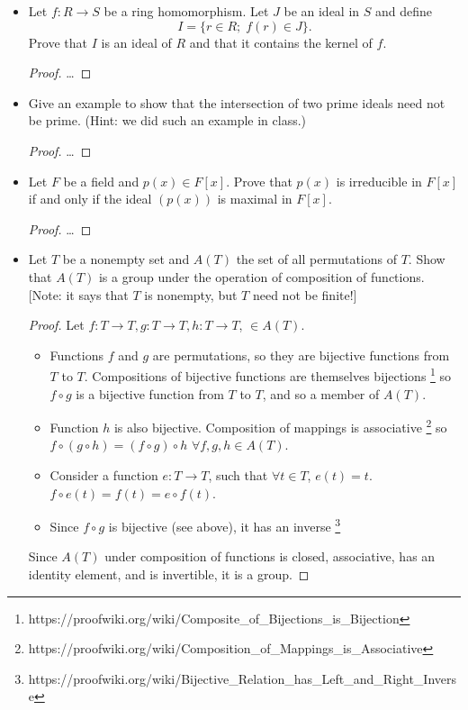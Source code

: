 \documentclass[12pt]{article}
\begin{document}
\begin{itemize}
		\item[\textbf{ 6.2.22.}] Let $f: R\to S$ be a ring homomorphism. Let $J$ be an ideal in $S$ and define \[I=\{r\in R;\; f(r)\in J\}.\] Prove that $I$ is an ideal of $R$ and that it contains the kernel of $f$.
		\begin{proof}
			\dots
		\end{proof}

		\item[\textbf{6.3.8.}] Give an example to show that the intersection of two prime ideals need not be prime. (Hint: we did such an example in class.)
		\begin{proof}
			\dots
		\end{proof}

		\item[\textbf{6.3.3b.}] Let $F$ be a field and $p(x)\in F[x]$. Prove that $p(x)$ is irreducible in $F[x]$ if and only if the ideal $(p(x))$ is maximal in $F[x]$.
		\begin{proof}
			\dots
		\end{proof}

		\item[\textbf{ 7.1.12.}] Let $T$ be a nonempty set and $A(T)$ the set of all permutations of $T$. Show that $A(T)$ is a group under the operation of composition of functions. [Note: it says that $T$ is nonempty, but $T$ need not be finite!]
		\begin{proof}
			Let $f:T \to T, g:T \to T, h:T \to T$, $\in A(T)$.
			\begin{itemize}
				\item[\textbullet] Functions $f$ and $g$ are permutations, so they are bijective functions from $T$ to $T$. Compositions of bijective functions are themselves bijections \footnote{https://proofwiki.org/wiki/Composite\_of\_Bijections\_is\_Bijection} so $f\circ g$ is a bijective function from $T$ to $T$, and so a member of $A(T)$.
				\item[\textbullet] Function $h$ is also bijective. Composition of mappings is associative \footnote{https://proofwiki.org/wiki/Composition\_of\_Mappings\_is\_Associative} so $f\circ(g\circ h) = (f\circ g)\circ h$ $\forall f, g, h \in A(T)$.
				\item[\textbullet] Consider a function $e: T\to T$, such that $\forall t\in T$, $e(t) = t$. $f\circ e(t) = f(t) = e\circ f(t)$.
				\item[\textbullet] Since $f\circ g$ is bijective (see above), it has an inverse \footnote{https://proofwiki.org/wiki/Bijective\_Relation\_has\_Left\_and\_Right\_Inverse}
			\end{itemize}
			Since $A(T)$ under composition of functions is closed, associative, has an identity element, and is invertible, it is a group.
		\end{proof}


\end{itemize}
\end{document}
